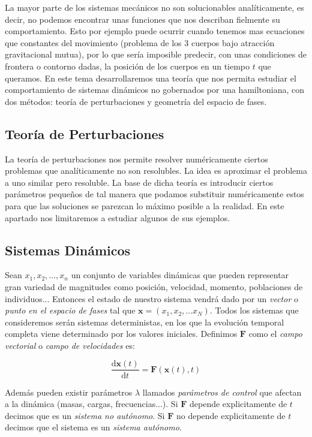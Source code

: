 \documentclass[12pt,a4paper]{article}
\numberwithin{equation}{section}
\numberwithin{figure}{section}
\newcommand{\D}{\mathrm{d}}
\newcommand{\derivadas}[2]{\frac{\D #1}{\D #2}}
\newcommand{\xn}{\mathbf{x}}
\newcommand{\Fn}{\mathbf{F}}
\begin{document}
La mayor parte de los sistemas mecánicos no son solucionables analíticamente, es decir, no podemos encontrar unas funciones que nos describan fielmente su comportamiento. Esto por ejemplo puede ocurrir cuando tenemos mas ecuaciones que constantes del movimiento (problema de los 3 cuerpos bajo atracción gravitacional mutua), por lo que sería imposible predecir, con unas condiciones de frontera o contorno dadas, la posición de los cuerpos en un tiempo $t$ que queramos. En este tema desarrollaremos una teoría que nos permita estudiar el comportamiento de sistemas dinámicos no gobernados por una hamiltoniana, con dos métodos: teoría de perturbaciones y geometría del espacio de fases. 

\subsection{Teoría de Perturbaciones}

La teoría de perturbaciones nos permite resolver numéricamente ciertos problemas que analíticamente no son resolubles. La idea es aproximar el problema a uno similar pero resoluble. La base de dicha teoría es introducir ciertos parámetros pequeños de tal manera que podamos substituir numéricamente estos para que las soluciones se parezcan lo máximo posible a la realidad. En este apartado nos limitaremos a estudiar algunos de sus ejemplos.

\subsection{Sistemas Dinámicos}

Sean $x_1,x_2,...,x_n$ un conjunto de variables dinámicas que pueden representar gran variedad de magnitudes como posición, velocidad, momento, poblaciones de individuos... Entonces el estado de nuestro sistema vendrá dado por un \textit{vector} o \textit{punto en el espacio de fases} tal que $\xn = (x_1,x_2,...x_N)$. Todos los sistemas que consideremos serán sistemas deterministas, en los que la evolución temporal completa viene determinado por los valores iniciales. Definimos $\Fn$ como el \textit{campo vectorial} o \textit{campo de velocidades} es:

\begin{equation}
\derivadas{\xn(t)}{t} = \Fn (\xn(t),t)
\end{equation}

Además pueden existir parámetros $\lambda$ llamados \textit{parámetros de control} que afectan a la dinámica (masas, cargas, frecuencias...). Si $\Fn$ depende explicitamente de $t$ decimos que es un \textit{sistema no autónomo}. Si $\Fn$ no depende explicitamente de $t$ decimos que el sistema es un \textit{sistema autónomo}. \\
\end{document}
